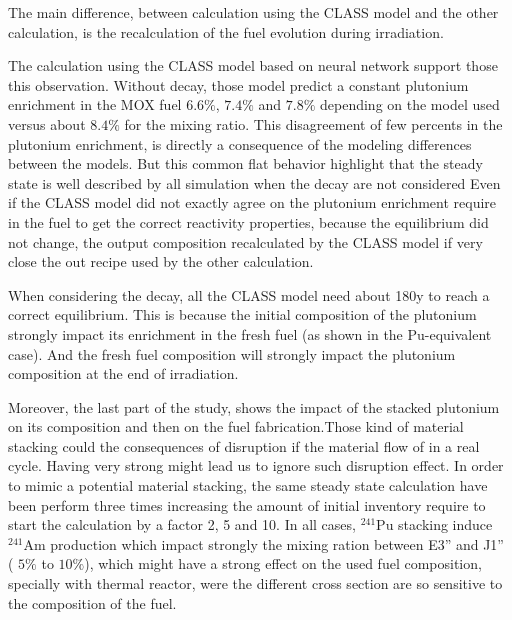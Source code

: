 \documentclass[10pt]{article}
\begin{document}
The main difference, between calculation using the CLASS model and the other
calculation, is the recalculation of the fuel evolution during irradiation. 

The calculation using the CLASS model based on neural network support those this
observation. Without decay, those model predict a constant plutonium enrichment
in the MOX fuel $6.6\%$, $7.4\%$ and $7.8\%$ depending on the model used versus
about $8.4\%$ for the mixing ratio. This disagreement of few percents in the
plutonium enrichment, is directly a consequence of the modeling differences
between the models.  But this common flat behavior highlight that the steady
state is well described by all simulation when the decay are not considered
Even if the CLASS model did not exactly agree on the plutonium enrichment
require in the fuel to get the correct reactivity properties, because the
equilibrium did not change, the output composition recalculated by the CLASS
model if very close the out recipe used by the other calculation.

When considering the decay, all the CLASS model need about 180y to reach a
correct equilibrium. This is because the initial composition of the plutonium
strongly impact its enrichment in the fresh fuel (as shown in the Pu-equivalent
case). And the fresh fuel composition will strongly impact the plutonium
composition at the end of irradiation. 

Moreover, the last part of the study, shows the impact of the stacked plutonium
on its composition and then on the fuel fabrication.Those kind of material
stacking could the consequences of disruption if the material flow of in a real
cycle. Having very strong might lead us to ignore such disruption effect.
In order to mimic a potential material stacking, the same steady state
calculation have been perform three times increasing the amount of initial
inventory require to start the calculation by a factor 2, 5 and 10. In all cases,
$^{241}$Pu stacking induce $^{241}$Am production which impact strongly the
mixing ration between E3'' and J1'' ( $5\%$ to $10\%$), which might have a
strong effect on the used fuel composition, specially with thermal reactor, were
the different cross section are so sensitive to the composition of the fuel.








\end{document}
